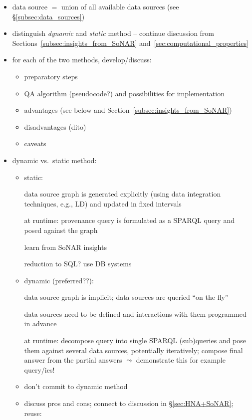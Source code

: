 \begin{itemize}
  \item
    data source $=$ union of all available data sources (see §\ref{subsec:data_sources})
  \item
    distinguish \emph{dynamic} and \emph{static} method -- continue discussion
    from Sections~\ref{subsec:insights_from_SoNAR} and~\ref{sec:computational_properties}
  \item
    for each of the two methods, develop/discuss:
    \begin{itemize}
      \item
        preparatory steps
      \item
        QA algorithm (pseudocode?) and possibilities for implementation
      \item
        advantages (see below and Section~\ref{subsec:insights_from_SoNAR})
      \item
        disadvantages (dito)
      \item
        caveats
    \end{itemize}
  \item
    dynamic vs.\ static method:
    \begin{itemize}
      \item
        static: 
        
        data source graph is generated explicitly (using data integration techniques, e.g., LD)
        and updated in fixed intervals
                
        at runtime: provenance query is formulated as a \gls{SPARQL} query and posed against the graph
        
        learn from SoNAR insights
        
        reduction to SQL? use DB systems
      \item
        dynamic (preferred??):
        
        data source graph is implicit; data sources are queried \enquote{on the fly}
        
        data sources need to be defined and
        interactions with them programmed in advance
        
        at runtime: decompose query into single \gls{SPARQL} (sub)queries and pose them against several data sources,
        potentially iteratively;
        compose final answer from the partial answers
        $\leadsto$ demonstrate this for example query/ies!
      \item
        don't commit to dynamic method %
      \item
        discuss pros and cons; connect to discussion in §\ref{sec:HNA+SoNAR}; reuse:
        

\end{itemize}
\end{itemize}
